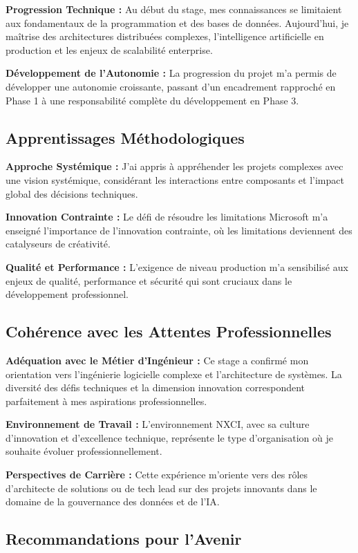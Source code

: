 \documentclass[a4paper,12pt]{article}
\begin{document}
\textbf{Progression Technique :}
Au début du stage, mes connaissances se limitaient aux fondamentaux de la programmation et des bases de données. Aujourd'hui, je maîtrise des architectures distribuées complexes, l'intelligence artificielle en production et les enjeux de scalabilité enterprise.

\textbf{Développement de l'Autonomie :}
La progression du projet m'a permis de développer une autonomie croissante, passant d'un encadrement rapproché en Phase 1 à une responsabilité complète du développement en Phase 3.

\subsection{Apprentissages Méthodologiques}

\textbf{Approche Systémique :}
J'ai appris à appréhender les projets complexes avec une vision systémique, considérant les interactions entre composants et l'impact global des décisions techniques.

\textbf{Innovation Contrainte :}
Le défi de résoudre les limitations Microsoft m'a enseigné l'importance de l'innovation contrainte, où les limitations deviennent des catalyseurs de créativité.

\textbf{Qualité et Performance :}
L'exigence de niveau production m'a sensibilisé aux enjeux de qualité, performance et sécurité qui sont cruciaux dans le développement professionnel.

\subsection{Cohérence avec les Attentes Professionnelles}

\textbf{Adéquation avec le Métier d'Ingénieur :}
Ce stage a confirmé mon orientation vers l'ingénierie logicielle complexe et l'architecture de systèmes. La diversité des défis techniques et la dimension innovation correspondent parfaitement à mes aspirations professionnelles.

\textbf{Environnement de Travail :}
L'environnement NXCI, avec sa culture d'innovation et d'excellence technique, représente le type d'organisation où je souhaite évoluer professionnellement.

\textbf{Perspectives de Carrière :}
Cette expérience m'oriente vers des rôles d'architecte de solutions ou de tech lead sur des projets innovants dans le domaine de la gouvernance des données et de l'IA.

\subsection{Recommandations pour l'Avenir}
\end{document}
